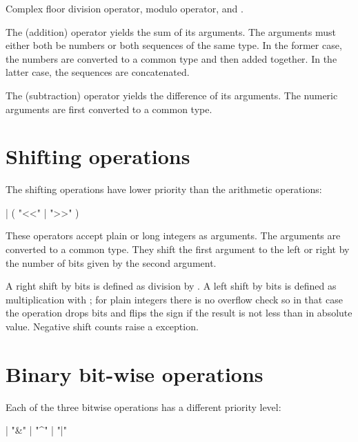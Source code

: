 Complex floor division operator, modulo operator, and
.


The \code{+} (addition) operator yields the sum of its arguments.
The arguments must either both be numbers or both sequences of the
same type.  In the former case, the numbers are converted to a common
type and then added together.  In the latter case, the sequences are
concatenated.

The \code{-} (subtraction) operator yields the difference of its
arguments.  The numeric arguments are first converted to a common
type.


\section{Shifting operations\label{shifting}}

The shifting operations have lower priority than the arithmetic
operations:

\begin{productionlist}
             {
              |  ( "<<" | ">>" ) }
\end{productionlist}

These operators accept plain or long integers as arguments.  The
arguments are converted to a common type.  They shift the first
argument to the left or right by the number of bits given by the
second argument.

A right shift by  bits is defined as division by
.  A left shift by  bits is defined as
multiplication with ; for plain integers there is
no overflow check so in that case the operation drops bits and flips
the sign if the result is not less than  in absolute
value.  Negative shift counts raise a 
exception.


\section{Binary bit-wise operations\label{bitwise}}

Each of the three bitwise operations has a different priority level:

\begin{productionlist}
             { |  "\&" }
             { |  "\textasciicircum" }
             { |  "|" }
\end{productionlist}

